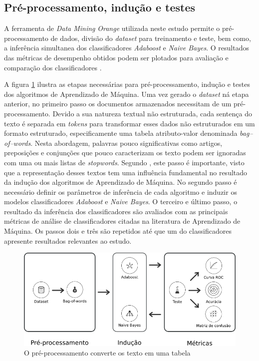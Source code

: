 \subsection{Pré-processamento, indução e testes}

A ferramenta de \textit{Data Mining} \textit{Orange} utilizada neste estudo 
permite o pré-processamento de dados, divisão do \textit{dataset} para 
treinamento e teste, bem como, a inferência simultanea dos classificadores 
\textit{Adaboost} e \textit{Naive Bayes}. O resultados das métricas de 
desempenho obtidos podem ser plotados para avaliação e comparação dos 
classificadores \cite{wahbeh2011comparison}.

A figura \ref{figure:metodologia_2} ilustra as etapas necessárias para 
pré-processamento, indução e testes dos algoritmos de Aprendizado de Máquina. 
Uma vez gerado o \textit{dataset} ná etapa anterior, no primeiro passo os 
documentos armazenados necessitam de um pré-processamento. Devido a sua 
natureza textual não estruturada, cada sentença do texto é separada em 
\textit{tokens} para transformar esses dados não estruturados em um formato 
estruturado, especificamente uma tabela atributo-valor denominada 
\textit{bag--of--words}. Nesta abordagem, palavras pouco significativas como 
artigos, preposições e conjunções que pouco caracterizam os texto podem ser 
ignoradas com uma ou mais listas de \textit{stopwords}. Segundo 
\cite{matsubara2003pretext}, este passo é importante, visto que a representação 
desses textos tem uma influência fundamental no resultado da indução dos 
algoritmos de Aprendizado de Máquina. No segundo passo é necessário definir os 
parâmetros de inferência de cada algoritmo e induzir os modelos classificadores 
\textit{Adaboost} e \textit{Naive Bayes}. O terceiro e último passo, o 
resultado da inferência dos classificadores são avaliados com as principais 
métricas de análise de classificadores citadas na literatura de Aprendizado de 
Máquina. Os passos dois e três são repetidos até que um do classificadores 
apresente resultados relevantes ao estudo.

\begin{figure}[H]
\begin{center}
    \includegraphics[scale=0.70]{images/metodologia_2.png}
\end{center}
\caption{O pré-processamento converte os texto em uma tabela }
\label{figure:metodologia_2}
\end{figure}